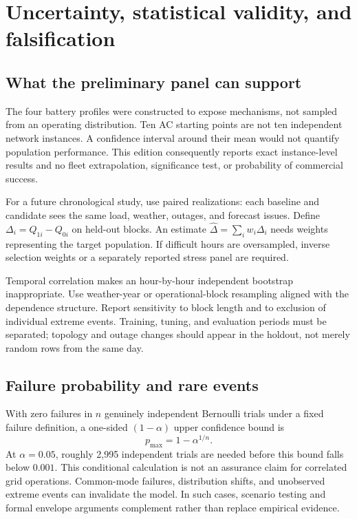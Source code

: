 \documentclass[11pt,letterpaper]{article}
\begin{document}
\section{Uncertainty, statistical validity, and falsification}
\label{sec:uncertainty}
\subsection{What the preliminary panel can support}
The four battery profiles were constructed to expose mechanisms, not sampled from an operating distribution. Ten AC starting points are not ten independent network instances. A confidence interval around their mean would not quantify population performance. This edition consequently reports exact instance-level results and no fleet extrapolation, significance test, or probability of commercial success.

For a future chronological study, use paired realizations: each baseline and candidate sees the same load, weather, outages, and forecast issues. Define $\Delta_i=Q_{1i}-Q_{0i}$ on held-out blocks. An estimate $\hat\Delta=\sum_iw_i\Delta_i$ needs weights representing the target population. If difficult hours are oversampled, inverse selection weights or a separately reported stress panel are required.

Temporal correlation makes an hour-by-hour independent bootstrap inappropriate. Use weather-year or operational-block resampling aligned with the dependence structure. Report sensitivity to block length and to exclusion of individual extreme events. Training, tuning, and evaluation periods must be separated; topology and outage changes should appear in the holdout, not merely random rows from the same day.

\subsection{Failure probability and rare events}
With zero failures in $n$ genuinely independent Bernoulli trials under a fixed failure definition, a one-sided $(1-\alpha)$ upper confidence bound is
\[
 p_{\max}=1-\alpha^{1/n}.
\]
At $\alpha=0.05$, roughly 2,995 independent trials are needed before this bound falls below $0.001$. This conditional calculation is not an assurance claim for correlated grid operations. Common-mode failures, distribution shifts, and unobserved extreme events can invalidate the model. In such cases, scenario testing and formal envelope arguments complement rather than replace empirical evidence.
\end{document}
